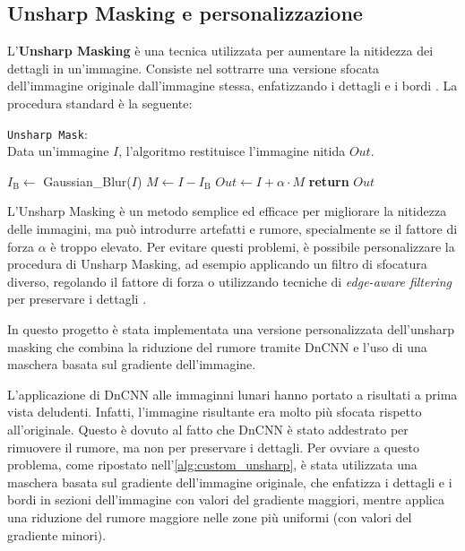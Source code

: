 \subsection{Unsharp Masking e personalizzazione} \label{subsec:unsharp_mask}

L'\textbf{Unsharp Masking} è una tecnica utilizzata per aumentare la nitidezza dei dettagli in un'immagine. Consiste nel sottrarre una versione sfocata dell'immagine originale dall'immagine stessa, enfatizzando i dettagli e i bordi \cite{unsharp_mask_book}. La procedura standard è la seguente:

\begin{algorithm}[H]
    \caption{\texttt{Unsharp Mask}:\\ Data un'immagine $I$, l'algoritmo restituisce l'immagine nitida $Out$.} \label{alg:unsharp}
    \begin{algorithmic}
            \State $I_{\text{B}} \gets$ Gaussian\_Blur($I$) 
            \State $M \gets I - I_{\text{B}}$ 
            \State $Out \gets I + \alpha \cdot M$ 
            \State \textbf{return} $Out$
        \EndFunction
    \end{algorithmic}
\end{algorithm}


L'Unsharp Masking è un metodo semplice ed efficace per migliorare la nitidezza delle immagini, ma può introdurre artefatti e rumore, specialmente se il fattore di forza $\alpha$ è troppo elevato. Per evitare questi problemi, è possibile personalizzare la procedura di Unsharp Masking, ad esempio applicando un filtro di sfocatura diverso, regolando il fattore di forza o utilizzando tecniche di \textit{edge-aware filtering} per preservare i dettagli \cite{unsharp_mask}.

In questo progetto è stata implementata una versione personalizzata dell'unsharp masking che combina la riduzione del rumore tramite DnCNN e l'uso di una maschera basata sul gradiente dell'immagine.

L'applicazione di DnCNN alle immaginni lunari hanno portato a risultati a prima vista deludenti. Infatti, l'immagine risultante era molto più sfocata rispetto all'originale. Questo è dovuto al fatto che DnCNN è stato addestrato per rimuovere il rumore, ma non per preservare i dettagli. Per ovviare a questo problema, come ripostato nell'\cref{alg:custom_unsharp}, è stata utilizzata una maschera basata sul gradiente dell'immagine originale, che enfatizza i dettagli e i bordi in sezioni dell'immagine con valori del gradiente maggiori, mentre applica una riduzione del rumore maggiore nelle zone più uniformi (con valori del gradiente minori).

